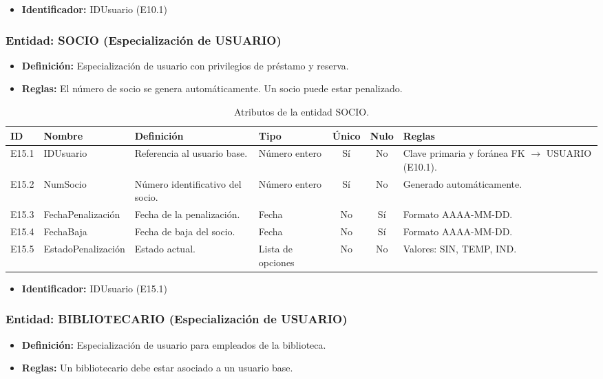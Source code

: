 \begin{itemize}
	\item\textbf{Identificador:} IDUsuario (E10.1)
\end{itemize}

\subsubsection{Entidad: SOCIO (Especialización de USUARIO)}
\begin{itemize}
	\item\textbf{Definición:} Especialización de usuario con privilegios de préstamo y reserva.
	\item\textbf{Reglas:} El número de socio se genera automáticamente. Un socio puede estar penalizado.
\end{itemize}

\begin{table}[H]
	\centering
	\caption{Atributos de la entidad SOCIO.}
	\label{tab:dict_socio}
	\small
	\begin{tabularx}{\textwidth}{l l X l c c X}
		\toprule
		\textbf{ID} & \textbf{Nombre} & \textbf{Definición} & \textbf{Tipo} & \textbf{Único} & \textbf{Nulo} & \textbf{Reglas} \\
		\midrule
		E15.1 & IDUsuario & Referencia al usuario base. & Número entero & Sí & No & Clave primaria y foránea FK $\rightarrow$ USUARIO (E10.1). \\
		\addlinespace
		E15.2 & NumSocio & Número identificativo del socio. & Número entero & Sí & No & Generado automáticamente. \\
		\addlinespace
		E15.3 & FechaPenalización & Fecha de la penalización. & Fecha & No & Sí & Formato AAAA-MM-DD. \\
		\addlinespace
		E15.4 & FechaBaja & Fecha de baja del socio. & Fecha & No & Sí & Formato AAAA-MM-DD. \\
		\addlinespace
		E15.5 & EstadoPenalización & Estado actual. & Lista de opciones & No & No & Valores: SIN, TEMP, IND. \\
		\bottomrule
	\end{tabularx}
\end{table}

\begin{itemize}
	\item\textbf{Identificador:} IDUsuario (E15.1)
\end{itemize}

\subsubsection{Entidad: BIBLIOTECARIO (Especialización de USUARIO)}
\begin{itemize}
	\item\textbf{Definición:} Especialización de usuario para empleados de la biblioteca.
	\item\textbf{Reglas:} Un bibliotecario debe estar asociado a un usuario base.
\end{itemize}

